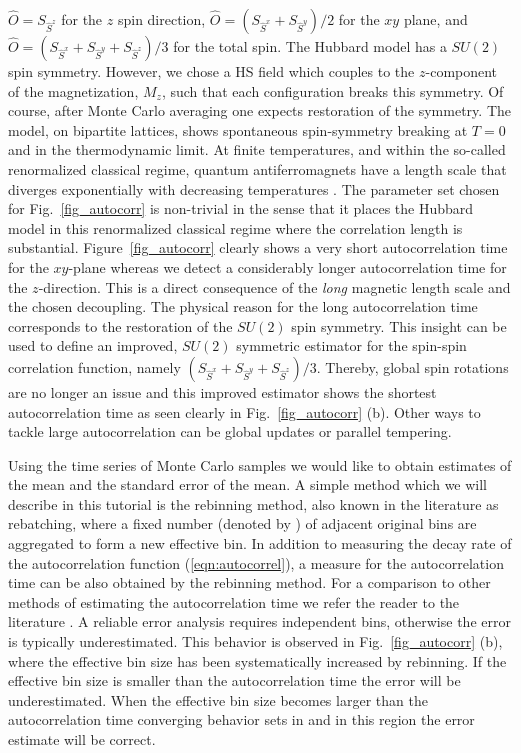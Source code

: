 $\hat{O} = S_{\hat{S}^{z}}$ for the $z$ spin direction, 
$\hat{O} =(S_{\hat{S}^{x}} + S_{\hat{S}^{y}})/2$ for the $xy$ plane, and
$\hat{O} =(S_{\hat{S}^{x}} + S_{\hat{S}^{y}}+ S_{\hat{S}^{z}})/3$ for the total spin.
 The Hubbard model  has a $SU(2)$ spin symmetry. However, we chose a HS field which couples to the $z$-component of the magnetization,  $M_z$,  such that each configuration breaks this symmetry. Of course, after Monte Carlo averaging one expects restoration of the symmetry. The model, on bipartite  lattices,  shows spontaneous spin-symmetry breaking at $T=0$ and in the thermodynamic limit.  At finite temperatures, and within the so-called renormalized classical regime,  quantum antiferromagnets have a length scale  that  diverges  exponentially  with decreasing temperatures \cite{Chakravarty88}.     
The parameter set chosen for Fig.~\ref{fig_autocorr}  is non-trivial in the sense that it places the Hubbard model in this renormalized classical regime where the correlation length is substantial.  Figure~\ref{fig_autocorr}  clearly shows a very short autocorrelation time for the $xy$-plane whereas we detect a considerably longer  autocorrelation time  for the $z$-direction.  This is a direct consequence of the {\it long} magnetic length scale and the chosen decoupling.
The physical reason for the long autocorrelation time  corresponds to  the restoration of the $SU(2)$ spin symmetry.    This insight can be used to define an improved, $SU(2)$ symmetric estimator for the spin-spin correlation function, namely
$(S_{\hat{S}^{x}} + S_{\hat{S}^{y}} + S_{\hat{S}^{z}})/3$. 
 Thereby, global spin rotations are no longer an issue and this improved estimator  shows the shortest autocorrelation time as seen clearly in Fig.~\ref{fig_autocorr} (b). Other ways to tackle large autocorrelation can be global updates or parallel tempering.

Using the time series of Monte Carlo samples we would like to obtain estimates of the mean and the standard error of the mean.
A simple method which we will describe in this tutorial is the rebinning method, also known in the literature as rebatching, where a fixed number (denoted by ) of adjacent original bins are aggregated to form a new effective bin.
In addition to measuring the decay rate of the autocorrelation function (\ref{eqn:autocorrel}), a measure for the autocorrelation time  can be also obtained by the rebinning method. 
For a comparison to other methods of estimating the autocorrelation time we refer the reader to the literature \cite{Thompson2010, Geyer1992, neal1993}.
A reliable error analysis requires independent bins, otherwise the error is typically underestimated. This behavior is observed in Fig.~\ref{fig_autocorr} (b), where the effective bin size has been systematically increased by rebinning. If the effective bin size is smaller than the autocorrelation time the error will be underestimated. When the effective bin size becomes  larger than the autocorrelation time converging behavior sets in and in this region the error estimate will be correct.

